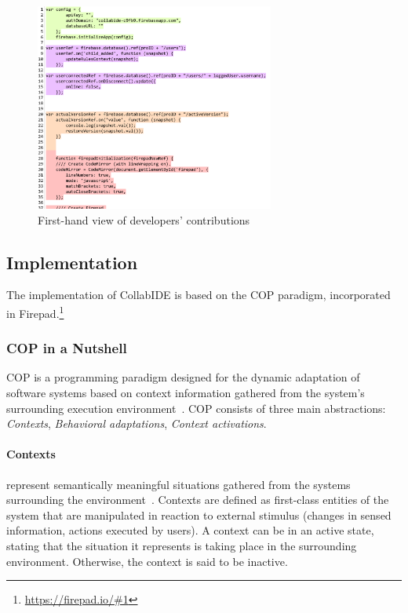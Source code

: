 \begin{figure}[htbp]
  \centering
  \includegraphics[width=0.7\textwidth]{img/fig2-collabIDEConcurrentProgramming}
  \caption{First-hand view of developers' contributions}
  \label{fig:layers}
\end{figure}


\subsection{Implementation}
\label{sec:implementation}

The implementation of CollabIDE is based on the \acf{COP} paradigm, incorporated in Firepad.\footnote{\url{https://firepad.io/\#1}}

\subsubsection{\ac{COP} in a Nutshell}
\ac{COP} is a programming paradigm designed for the dynamic adaptation of software systems based 
on context information gathered from the system's surrounding execution 
environment~\cite{salvaneschi+12survey}. \ac{COP} consists of three main abstractions: 
\emph{Contexts}, \emph{Behavioral adaptations}, \emph{Context activations}.

\paragraph{Contexts} represent semantically meaningful situations gathered from the systems 
surrounding the environment~\cite{dey01}. Contexts are defined as first-class entities of the system that 
are manipulated in reaction to external stimulus (\eg changes in sensed information, actions executed 
by users). A context can be in an active state, stating that the situation it represents is taking place in 
the surrounding environment. Otherwise, the context is said to be inactive.

